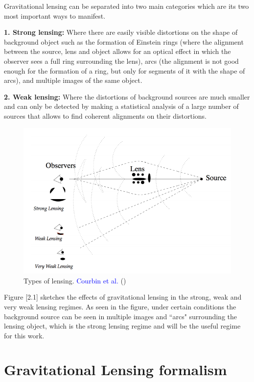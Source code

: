 Gravitational lensing can be separated into two main categories which are its two most important ways to manifest.

\textbf{1. Strong lensing:} Where there are easily visible distortions on the shape of background object such as the formation of Einstein rings (where the alignment between the source, lens and object allows for an optical effect in which the observer sees a full ring surrounding the lens), arcs (the alignment is not good enough for the formation of a ring, but only for  segments of it with the shape of arcs), and multiple images of the same object.

\textbf{2. Weak lensing:} Where the distortions of background sources are much smaller and can only be detected by making a statistical analysis of a large number of sources that allows to find coherent alignments on their distortions.

\begin{figure}[H]
\centering
\includegraphics[width=12cm]{images/types_of_lensing.png}
\caption[Types of lensing]{Types of lensing. \textcolor{blue}{Courbin et al.} (\citeyear{Reference24})}
\end{figure}

Figure [2.1] sketches the effects of gravitational lensing in the strong, weak and very weak lensing regimes. As seen in the figure, under certain conditions the background source can be seen in multiple images and ``arcs" surrounding the lensing object, which is the strong lensing regime and will be the useful regime for this work. 

\section{Gravitational Lensing formalism}

